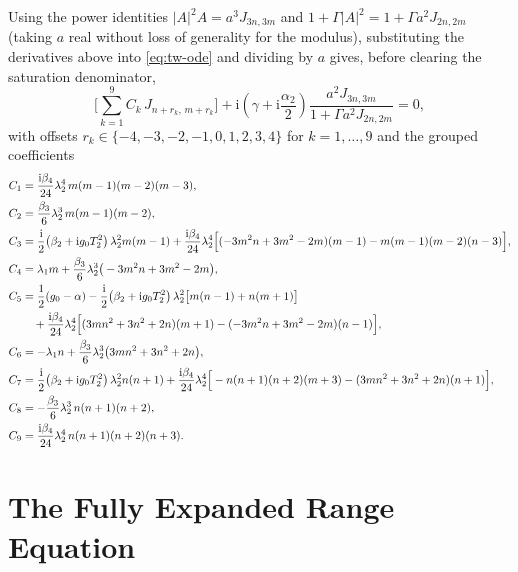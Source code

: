 \documentclass[11pt]{article}
\newcommand{\ii}{\mathrm{i}}
\begin{document}
Using the power identities $|A|^2A=a^3J_{3n,3m}$ and $1+\Gamma|A|^2=1+\Gamma a^2J_{2n,2m}$
(taking $a$ real without loss of generality for the modulus), substituting the
derivatives above into \eqref{eq:tw-ode} and dividing by $a$ gives, before clearing the
saturation denominator,
\begin{equation}
\Big[\textstyle\sum_{k=1}^{9} C_k\,J_{n+r_k,\,m+r_k}\Big]
+\ii\!\left(\gamma+\ii\frac{\alpha_2}{2}\right)\frac{a^2J_{3n,3m}}{1+\Gamma a^2J_{2n,2m}}=0,
\label{eq:premultiplied}
\end{equation}
with offsets $r_k\in\{-4,-3,-2,-1,0,1,2,3,4\}$ for $k=1,\dots,9$ and the grouped
coefficients
\begin{align}
C_1&=\frac{\ii\beta_4}{24}\lambda_2^4\,m(m-1)(m-2)(m-3), \\
C_2&=\frac{\beta_3}{6}\lambda_2^3\,m(m-1)(m-2), \\
C_3&=\frac{\ii}{2}\!\left(\beta_2+\ii g_0T_2^2\right)\lambda_2^2m(m-1)
+\frac{\ii\beta_4}{24}\lambda_2^4\Big[(-3m^2n+3m^2-2m)(m-1)-m(m-1)(m-2)(n-3)\Big], \\
C_4&=\lambda_1 m+\frac{\beta_3}{6}\lambda_2^3\big(-3m^2n+3m^2-2m\big), \\
C_5&=\frac{1}{2}(g_0-\alpha)
-\frac{\ii}{2}\!\left(\beta_2+\ii g_0T_2^2\right)\lambda_2^2\big[m(n-1)+n(m+1)\big] \notag\\
&\quad+\frac{\ii\beta_4}{24}\lambda_2^4\Big[(3mn^2+3n^2+2n)(m+1)-(-3m^2n+3m^2-2m)(n-1)\Big], \\
C_6&=-\lambda_1 n+\frac{\beta_3}{6}\lambda_2^3\big(3mn^2+3n^2+2n\big), \\
C_7&=\frac{\ii}{2}\!\left(\beta_2+\ii g_0T_2^2\right)\lambda_2^2n(n+1)
+\frac{\ii\beta_4}{24}\lambda_2^4\Big[-n(n+1)(n+2)(m+3)-(3mn^2+3n^2+2n)(n+1)\Big], \\
C_8&=-\frac{\beta_3}{6}\lambda_2^3\,n(n+1)(n+2), \\
C_9&=\frac{\ii\beta_4}{24}\lambda_2^4\,n(n+1)(n+2)(n+3).
\end{align}

\section{The Fully Expanded Range Equation}
\end{document}

